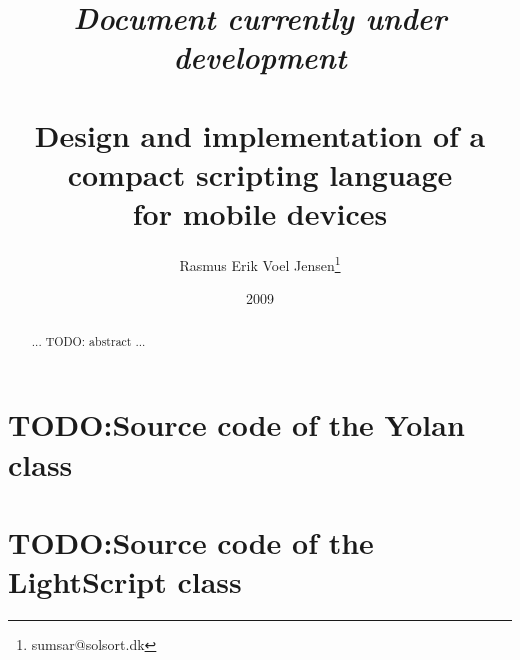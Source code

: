 \documentclass[11pt]{report}
\title{
\emph{Document currently under development} \\ ~ \\
Design and implementation of a \\
compact scripting language \\ 
for mobile devices}
\author{
  Rasmus Erik Voel Jensen\footnote{
    sumsar@solsort.dk
  }
}
\date{2009}
\begin{document}
\maketitle
\begin{abstract}
... TODO: abstract ...
\end{abstract}

\setcounter{tocdepth}{2}
\tableofcontents
\listoffigures












%
%

\newpage
{}



\appendix



\chapter{TODO:Source code of the Yolan class}


\chapter{TODO:Source code of the LightScript class}



\newpage
{}
\printindex
\end{document}
